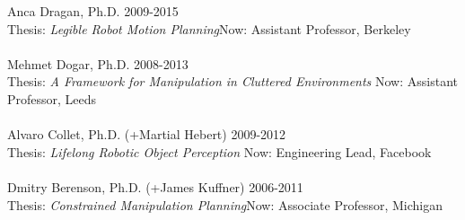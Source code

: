 Anca Dragan, Ph.D. \hfill 2009-2015\\
Thesis: \textit{Legible Robot Motion Planning}\hfill Now: Assistant Professor, Berkeley\\
\\
Mehmet Dogar, Ph.D. \hfill 2008-2013\\
Thesis: \textit{A Framework for Manipulation in Cluttered Environments} \hfill Now: Assistant Professor, Leeds\\
\\
Alvaro Collet, Ph.D. (+Martial Hebert) \hfill 2009-2012\\
Thesis: \textit{Lifelong Robotic Object Perception} \hfill Now: Engineering Lead, Facebook\\
\\
Dmitry Berenson, Ph.D. (+James Kuffner) \hfill 2006-2011\\
Thesis: \textit{Constrained Manipulation Planning}\hfill Now: Associate Professor, Michigan\\

